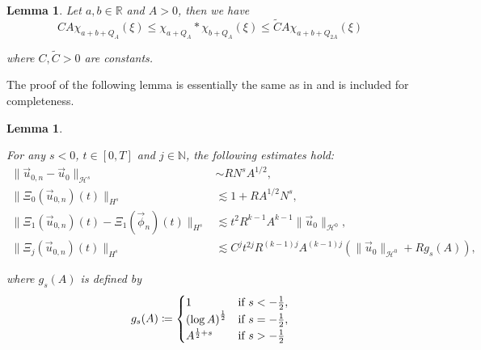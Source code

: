 \documentclass[letterpaper, 11pt,  reqno]{amsart}
\newtheorem{lemma}[theorem]{Lemma}
\newcommand{\1}{\hspace{0.5mm}\text{I}\hspace{0.5mm}}
\newcommand{\noi}{\noindent}
\newcommand{\R}{\mathbb{R}}
\newcommand{\NB}{\mathbb{N}}
\renewcommand{\H}{\mathcal{H}}
\newcommand{\les}{\lesssim}
\numberwithin{equation}{section}
\numberwithin{theorem}{section}
\begin{document}
\begin{lemma}
\label{LEM:ConvolutionIneq}
Let $a,b \in \R$ and $A > 0$, then we have
$$
C A \chi_{a + b + Q_A } (\xi) \leq  \chi_{a + Q_A } \ast \chi_{b + Q_A } (\xi) \leq \widetilde{C} A \chi_{a + b + Q_{2A}}(\xi )
$$

\noi where $C, \widetilde{C} > 0$ are constants.
\end{lemma}

The proof of the following lemma is essentially the same as in \cite[Lemma 3.2]{FO} and is included for completeness.

\begin{lemma}
\label{LEM:MultilinearEst}

For any $s <0$, $t \in [0, T]$ and $j \in \NB$, the following estimates hold:
\begin{align}
\| \vec{u}_{0,n} - \vec{u}_0 \|_{\H^s} & \sim RN^s A^{1/2}, \label{EQ:MultilinearEst1} \\
\| \Xi_0 (\vec{u}_{0,n})(t) \|_{H^s} & \les 1 + RA^{1/2} N^s, \label{EQ:MultilinearEst2} \\
\| \Xi_1 (\vec{u}_{0,n})(t) - \Xi_1 (\vec{\phi}_n) (t) \|_{H^s} & \les t^2 R^{k-1}A^{k-1} \| \vec{u}_0 \|_{\H^0}, \label{EQ:MultilinearEst3} \\
\| \Xi_j (\vec{u}_{0,n})(t) \|_{H^s} & \les C^j t^{2j} R^{(k-1)j}A^{(k-1)j} \left( \| \vec{u}_0 \|_{\H^0} +  R g_s (A) \right), \label{EQ:MultilinearEst4}
\end{align}

\noi where $g_s (A)$ is defined by 
\begin{equation}
\label{DEF:gs}
g_s (A) \coloneqq
\begin{cases}
 1 & \textup{if } s<-\frac{1}{2}, \\
 \left( \log A \right)^{\frac{1}{2}}& \textup{if } s=-\frac{1}{2}, \\
 A^{\frac{1}{2}+s} & \textup{if }  s>-\frac{1}{2}
\end{cases}
\end{equation}

\end{lemma}
\end{document}
